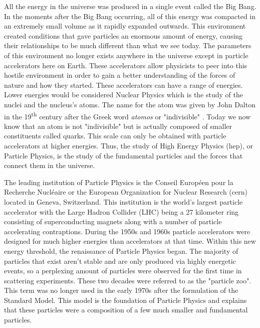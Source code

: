 All the energy in the universe was produced in a single event called the Big Bang. In the moments
after the Big Bang occurring, all of this energy was compacted in an extremely small volume as it rapidly 
expanded outwards. This environment created conditions that gave particles an enormous amount of energy, causing their 
relationships to be much different than what we see today. The parameters of this environment no longer exists anywhere
in the universe except in particle accelerators here on Earth. These accelerators allow physicists to peer into this
hostile environment in order to gain a better understanding of the forces of nature and how they started. These accelerators
can have a range of energies. Lower energies would be considered Nuclear Physics which is the study of the nuclei and 
the nucleus's atoms. The name for the atom was given by John Dalton in the 19\textsuperscript{th} century after the Greek word \textit{atomos}
or "indivisible" \cite{Grossman}. Today we now know that an atom is not "indivisible" but is actually composed of smaller constituents called quarks.
This scale can only be obtained with particle accelerators at higher energies. Thus, the study of High Energy Physics (\gls{hep}), or Particle
Physics, is the study of the fundamental particles and the forces that connect them in the universe.
\par

The leading institution of Particle Physics is the Conseil Européen pour la Recherche Nucléaire or the European Organization for Nuclear Research 
(\gls{cern}) located in Geneva, Switzerland. This institution is the world's largest particle accelerator with the Large Hadron Collider (LHC) being a  27 kilometer
ring consisting of superconducting magnets along with a number of particle accelerating contraptions.
During the 1950s and 1960s particle accelerators were designed for much higher energies than accelerators at that time. Within this new energy threshold, 
the renaissance of Particle Physics began. The majority of particles that exist aren't stable and are only produced via highly 
energetic events, so a perplexing amount of particles were observed for the first time in scattering experiments. These two decades
were referred to as the "particle zoo". This term was no longer used in the early 1970s after the formulation of 
the Standard Model. This model is the foundation of Particle Physics and explains that these particles were a composition of a few much smaller 
and fundamental particles. 
\\


